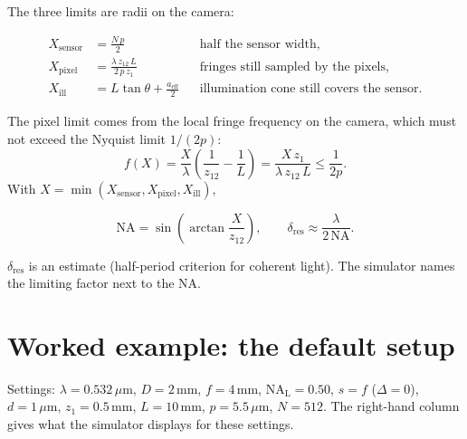 \documentclass[12pt,a4paper]{article}
\newcommand{\um}{\,\mu\mathrm{m}}
\newcommand{\mm}{\,\mathrm{mm}}
\begin{document}
The three limits are radii on the camera:
\begin{keyeq}
\begin{align}
X_\mathrm{sensor}&=\frac{N\,p}{2} &&\text{half the sensor width,}\\
X_\mathrm{pixel}&=\frac{\lambda\,z_{12}\,L}{2\,p\,z_1} &&\text{fringes still sampled by the pixels,}\\
X_\mathrm{ill}&=L\tan\theta+\frac{a_\mathrm{eff}}{2} &&\text{illumination cone still covers the sensor.}
\end{align}
\end{keyeq}
The pixel limit comes from the local fringe frequency on the camera, which must not exceed the Nyquist limit $1/(2p)$:
\begin{equation}
f(X)=\frac{X}{\lambda}\left(\frac{1}{z_{12}}-\frac{1}{L}\right)=\frac{X\,z_1}{\lambda\,z_{12}\,L}\le\frac{1}{2p}.
\end{equation}
With $X=\min(X_\mathrm{sensor},X_\mathrm{pixel},X_\mathrm{ill})$,
\begin{keyeq}
\begin{equation}
\mathrm{NA}=\sin\!\left(\arctan\frac{X}{z_{12}}\right),\qquad
\delta_\mathrm{res}\approx\frac{\lambda}{2\,\mathrm{NA}}.
\label{eq:res}
\end{equation}
\end{keyeq}
$\delta_\mathrm{res}$ is an estimate (half-period criterion for coherent light). The simulator names the limiting factor next to the NA.

\section{Worked example: the default setup}
\label{sec:example}

Settings: $\lambda=0.532\um$, $D=2\mm$, $f=4\mm$, $\mathrm{NA_L}=0.50$, $s=f$ ($\Delta=0$), $d=1\um$, $z_1=0.5\mm$, $L=10\mm$, $p=5.5\um$, $N=512$.
The right-hand column gives what the simulator displays for these settings.
\end{document}
